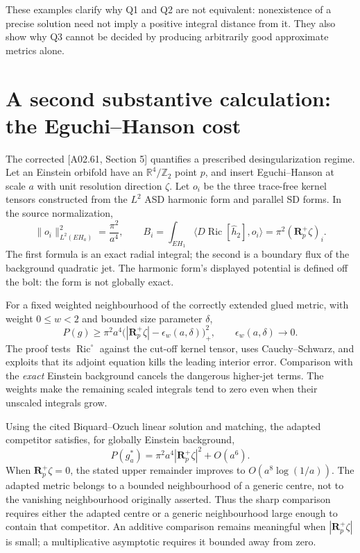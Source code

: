 \documentclass[11pt]{article}
\newcommand{\Ric}{\operatorname{Ric}}
\newcommand{\Rplus}{\mathbf R^+}
\newcommand{\sref}[1]{\textsf{[#1]}}
\theoremstyle{remark}
\begin{document}
These examples clarify why Q1 and Q2 are not equivalent: nonexistence of a
precise solution need not imply a positive integral distance from it. They
also show why Q3 cannot be decided by producing arbitrarily good approximate
metrics alone.

\section{A second substantive calculation: the Eguchi--Hanson cost}
\label{sec:eh}

The corrected \sref{A02.61, Section 5} quantifies a prescribed
desingularization regime. Let an Einstein orbifold have an
$\mathbb R^4/\mathbb Z_2$ point $p$, and insert Eguchi--Hanson at scale $a$
with unit resolution direction $\zeta$. Let $o_i$ be the three trace-free
kernel tensors constructed from the $L^2$ ASD harmonic form and parallel SD
forms. In the source normalization,
\[
 \|o_i\|_{L^2(EH_a)}^2=\frac{\pi^2}{a^4},\qquad
 B_i=\int_{EH_1}\langle D\Ric[\widehat h_2],o_i\rangle
     =\pi^2(\Rplus_p\zeta)_i.
\]
The first formula is an exact radial integral; the second is a boundary flux
of the background quadratic jet. The harmonic form's displayed potential is
defined off the bolt: the form is not globally exact.

For a fixed weighted neighbourhood of the correctly extended glued metric,
with weight $0\le w<2$ and bounded size parameter $\delta$,
\begin{equation}
 P(g)\ge\pi^2a^4
       \bigl(|\Rplus_p\zeta|-\epsilon_w(a,\delta)\bigr)_+^2,
 \qquad \epsilon_w(a,\delta)\longrightarrow0.\label{eq:ehlower}
\end{equation}
The proof tests $\Ric^\circ$ against the cut-off kernel tensor, uses
Cauchy--Schwarz, and exploits that its adjoint equation kills the leading
interior error. Comparison with the \emph{exact} Einstein background cancels
the dangerous higher-jet terms. The weights make the remaining scaled
integrals tend to zero even when their unscaled integrals grow.

Using the cited Biquard--Ozuch linear solution and matching, the adapted
competitor satisfies, for globally Einstein background,
\begin{equation}
 P(g_a^*)=\pi^2a^4|\Rplus_p\zeta|^2+O(a^6).
 \label{eq:ehupper}
\end{equation}
When $\Rplus_p\zeta=0$, the stated upper remainder improves to
$O(a^8\log(1/a))$. The adapted metric belongs to a bounded neighbourhood of a
generic centre, not to the vanishing neighbourhood originally asserted.
Thus the sharp comparison requires either the adapted centre or a generic
neighbourhood large enough to contain that competitor. An additive
comparison remains meaningful when $|\Rplus_p\zeta|$ is small; a
multiplicative asymptotic requires it bounded away from zero.
\end{document}
